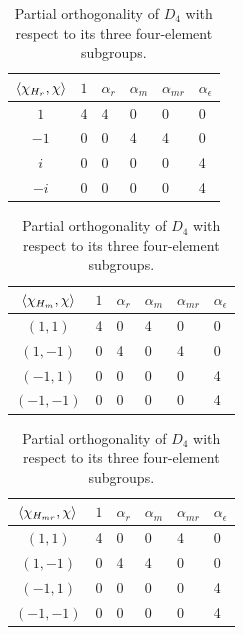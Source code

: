 \documentclass[a4paper,twocolumn,11pt]{quantumarticle}
\begin{document}
\begin{table}[h]
\centering
\begin{tabular}{|c|lllll|}\hline
  $\braket{\chi_{H_r}, \chi}$ & $1$ & $\alpha_{r}$ & $\alpha_{m}$ & $\alpha_{mr}$ & $\alpha_{\epsilon}$ \\ \hline
$1$ & 4   & 4            & 0             & 0               & 0                   \\ 
$-1$ & 0   & 0            & 4             & 4               & 0                   \\ 
$i$ & 0   & 0            & 0             & 0               & 4                   \\ 
$-i$ & 0   & 0            & 0             & 0               & 4                   \\ \hline
\end{tabular}

\vspace{0.3cm}

\begin{tabular}{|c|lllll|}\hline
  $\braket{\chi_{H_m}, \chi}$ & $1$ & $\alpha_{r}$ & $\alpha_{m}$ & $\alpha_{mr}$ & $\alpha_{\epsilon}$ \\ \hline
$(1,1)$ & 4   & 0            & 4             & 0               & 0                   \\ 
$ (1,-1)$ & 0   & 4            & 0             & 4               & 0                   \\ 
$(-1,1)$ & 0   & 0            & 0             & 0               & 4                   \\ 
$(-1,-1)$ & 0   & 0            & 0             & 0               & 4                   \\ \hline
\end{tabular}

\vspace{0.3cm}

\begin{tabular}{|c|lllll|}\hline
  $\braket{\chi_{H_{mr}}, \chi}$ & $1$ & $\alpha_{r}$ & $\alpha_{m}$ & $\alpha_{mr}$ & $\alpha_{\epsilon}$ \\ \hline
$(1,1)$ & 4   & 0            & 0             & 4               & 0                   \\ 
$ (1,-1)$ & 0   & 4            & 4             & 0               & 0                   \\ 
$(-1,1)$ & 0   & 0            & 0             & 0               & 4                   \\ 
$(-1,-1)$ & 0   & 0            & 0             & 0               & 4                   \\ \hline
\end{tabular}
\caption{Partial orthogonality of $D_4$ with respect to its three four-element subgroups.}
\label{tab:red_ch}
\end{table}
\end{document}
